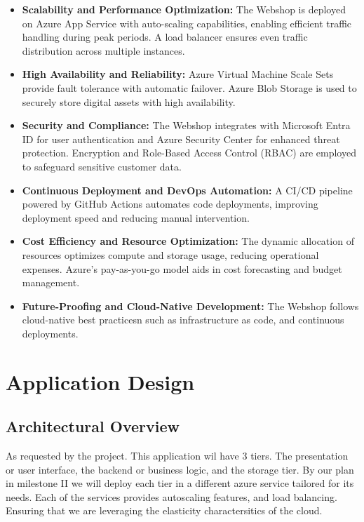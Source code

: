 \documentclass{llncs}
\begin{document}
\begin{itemize}
    \item \textbf{Scalability and Performance Optimization:}
          The Webshop is deployed on Azure App Service with auto-scaling capabilities, enabling efficient traffic handling during peak periods. A load balancer ensures even traffic distribution across multiple instances.
          \bigskip %
    \item \textbf{High Availability and Reliability:}
          Azure Virtual Machine Scale Sets provide fault tolerance with automatic failover. Azure Blob Storage is used to securely store digital assets with high availability.
          \bigskip %
    \item \textbf{Security and Compliance:}
          The Webshop integrates with Microsoft Entra ID for user authentication and Azure Security Center for enhanced threat protection. Encryption and Role-Based Access Control (RBAC) are employed to safeguard sensitive customer data.
          \bigskip %
    \item \textbf{Continuous Deployment and DevOps Automation:}
          A CI/CD pipeline powered by GitHub Actions automates code deployments, improving deployment speed and reducing manual intervention.
          \bigskip %
    \item \textbf{Cost Efficiency and Resource Optimization:}
          The dynamic allocation of resources optimizes compute and storage usage, reducing operational expenses. Azure’s pay-as-you-go model aids in cost forecasting and budget management.
          \bigskip %
    \item \textbf{Future-Proofing and Cloud-Native Development:}
          The Webshop follows cloud-native best practicesn such as infrastructure as code, and continuous deployments.
\end{itemize}

\section{Application Design}
\subsection{Architectural Overview}
As requested by the project. This application wil have 3 tiers. The presentation or user interface, the backend or business logic, and the storage tier.
By our plan in milestone II we will deploy each tier in a different azure service tailored for its needs.
Each of the services provides autoscaling features, and load balancing. Ensuring that we are leveraging the elasticity charactersitics of the cloud.
\end{document}
